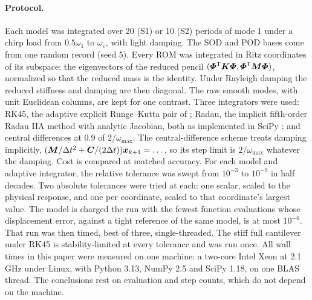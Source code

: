 \documentclass[preprint,12pt]{elsarticle}
\begin{document}
\paragraph{Protocol.} Each model was integrated over 20 (S1) or 10 (S2) periods of mode 1 under a chirp load from $0.5\omega_1$ to $\omega_{\mathrm c}$, with light damping. The SOD and POD bases come from one random record (seed 5).
Every ROM was integrated in Ritz coordinates of its subspace: the eigenvectors of the reduced pencil $(\bm{\varPhi}^{\mathsf T}\bm{K}\bm{\varPhi},\bm{\varPhi}^{\mathsf T}\bm{M}\bm{\varPhi})$, normalized so that the reduced mass is the identity. Under Rayleigh damping the reduced stiffness and damping are then diagonal. The raw smooth modes, with unit Euclidean columns, are kept for one contrast.
Three integrators were used: RK45, the adaptive explicit Runge--Kutta pair of \citet{Dormand1980}; Radau, the implicit fifth-order Radau IIA method \citep{Hairer1996} with analytic Jacobian, both as implemented in SciPy \citep{Virtanen2020}; and central differences at 0.9 of $2/\omega_{\max}$. The central-difference scheme treats damping implicitly, $(\bm{M}/\Delta t^2+\bm{C}/(2\Delta t))\bm{x}_{k+1}=\dots$, so its step limit is $2/\omega_{\max}$ whatever the damping.
Cost is compared at matched accuracy. For each model and adaptive integrator, the relative tolerance was swept from $10^{-3}$ to $10^{-9}$ in half decades. Two absolute tolerances were tried at each: one scalar, scaled to the physical response, and one per coordinate, scaled to that coordinate's largest value. The model is charged the run with the fewest function evaluations whose displacement error, against a tight reference of the same model, is at most $10^{-6}$. That run was then timed, best of three, single-threaded. The stiff full cantilever under RK45 is stability-limited at every tolerance and was run once.
All wall times in this paper were measured on one machine: a two-core Intel Xeon at 2.1\,GHz under Linux, with Python 3.13, NumPy 2.5 and SciPy 1.18, on one BLAS thread. The conclusions rest on evaluation and step counts, which do not depend on the machine.

\begin{table}[t]
\centering\small
\caption{Integration cost at matched accuracy: the least work to reach a displacement error of $10^{-6}$; light Rayleigh damping, chirp load. ROMs in Ritz coordinates of their subspace; ``raw'' is the same SOD subspace in unit-Euclidean smooth modes. $\rho(\bm{A}_r)$: spectral radius of the first-order state matrix. CD: central-difference steps at 0.9 of $2/\omega_{\max}$. LU: Radau matrix factorizations. --: the single stability-limited RK45 run did not reach $10^{-6}$. Script: \texttt{c36\_cost\_matched.py}, table \texttt{mktab\_c\_cost.py}.}
\label{tab:cost}
\resizebox{\textwidth}{!}{}
\end{table}
\end{document}
